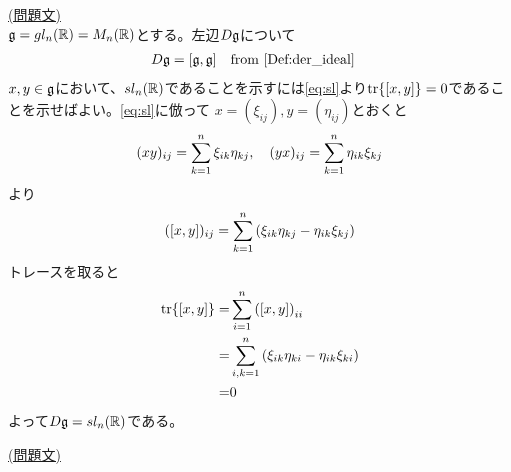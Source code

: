 \documentclass[fleqn,twocolumn,titlepage,dvipdfmx]{jsarticle}
\begin{document}
\clearpage


\setcounter{section}{1}
\setcounter{section}{2}
\begin{solution}\label{sol:1}
  \href{prob:1}{(問題文)}\\
  $\mathfrak{g}=gl_n(\mathbb{R})=M_n(\mathbb{R})$とする。左辺$D\mathfrak{g}$について
  \begin{align*}
    D\g=\comm{\g}{\g} \qq{from \cref{Def:der_ideal}}
  \end{align*}
  $x,y\in\mathfrak{g}$において、$sl_n(\mathbb{R})$であることを示すには\eqref{eq:sl}より$\tr{\comm{x}{y}}=0$であることを示せばよい。\eqref{eq:sl}に倣って
  $x=(\xi_{ij}),y=(\eta_{ij})$とおくと
  \begin{align*}
    (xy)_{ij}=\sum_{k=1}^{n}\xi_{ik}\eta_{kj}\qc
    (yx)_{ij}=\sum_{k=1}^{n}\eta_{ik}\xi_{kj}
  \end{align*}
  より
  \begin{align*}
    (\comm{x}{y})_{ij}=\sum_{k=1}^{n}\qty(\xi_{ik}\eta_{kj}-\eta_{ik}\xi_{kj})
  \end{align*}
  トレースを取ると
  \begin{align*}
    \tr{\comm{x}{y}}=&\sum_{i=1}^{n}\qty(\comm{x}{y})_{ii}\\
    =&\sum_{i,k=1}^{n}\qty(\xi_{ik}\eta_{ki}-\eta_{ik}\xi_{ki})\\
    =&0
  \end{align*}
  よって$D\mathfrak{g}=sl_n(\mathbb{R})$である。
\end{solution}

\begin{solution}\label{sol:2}
  \href{prob:2}{(問題文)}
\end{solution}
\end{document}
